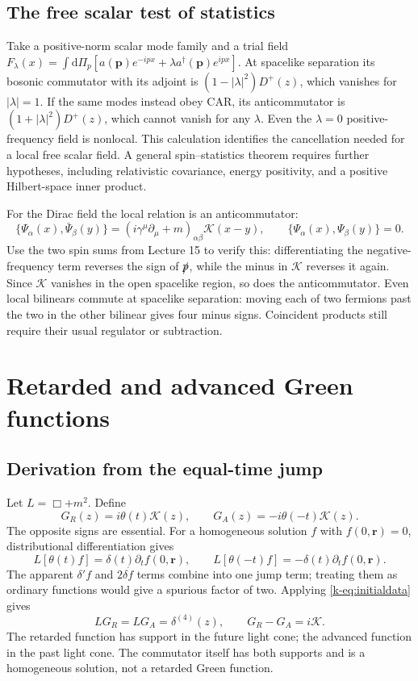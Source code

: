 \documentclass[11pt]{article}
\newcommand{\dd}{\mathrm{d}}
\begin{document}
\subsection{The free scalar test of statistics}
Take a positive-norm scalar mode family and a trial field
\(F_\lambda(x)=\int\dd\Pi_p[a(\bm p)e^{-ipx}
+\lambda a^\dagger(\bm p)e^{ipx}]\).
At spacelike separation its bosonic commutator with its adjoint is
\((1-|\lambda|^2)D^+(z)\), which vanishes for \(|\lambda|=1\).
If the same modes instead obey CAR, its anticommutator is
\((1+|\lambda|^2)D^+(z)\), which cannot vanish for any \(\lambda\).
Even the \(\lambda=0\) positive-frequency field is nonlocal.
This calculation identifies the cancellation needed for a local free
scalar field. A general spin--statistics theorem requires further
hypotheses, including relativistic covariance, energy positivity, and
a positive Hilbert-space inner product.

For the Dirac field the local relation is an anticommutator:
\begin{equation}
 \{\Psi_\alpha(x),\bar\Psi_\beta(y)\}
   =(i\gamma^\mu\partial_\mu+m)_{\alpha\beta}\mathcal K(x-y),
 \qquad \{\Psi_\alpha(x),\Psi_\beta(y)\}=0.
 \label{k-eq:Diraclocal}
\end{equation}
Use the two spin sums from Lecture 15 to verify this: differentiating the
negative-frequency term reverses the sign of \(\slashed p\), while the
minus in \(\mathcal K\) reverses it again. Since \(\mathcal K\) vanishes in
the open spacelike region, so does the anticommutator. Even local
bilinears commute at spacelike separation: moving each of two fermions
past the two in the other bilinear gives four minus signs. Coincident
products still require their usual regulator or subtraction.

\section{Retarded and advanced Green functions}
\subsection{Derivation from the equal-time jump}
Let \(L=\Box+m^2\). Define
\begin{equation}
 G_R(z)=i\theta(t)\mathcal K(z),\qquad
 G_A(z)=-i\theta(-t)\mathcal K(z).
 \label{k-eq:RA}
\end{equation}
The opposite signs are essential. For a homogeneous solution \(f\) with
\(f(0,\bm r)=0\), distributional differentiation gives
\[
 L[\theta(t)f]=\delta(t)\partial_t f(0,\bm r),\qquad
 L[\theta(-t)f]=-\delta(t)\partial_t f(0,\bm r).
\]
The apparent \(\delta' f\) and \(2\delta\dot f\) terms combine into one
jump term; treating them as ordinary functions would give a spurious
factor of two. Applying \eqref{k-eq:initialdata} gives
\begin{equation}
 LG_R=LG_A=\delta^{(4)}(z),\qquad G_R-G_A=i\mathcal K.
 \label{k-eq:RAequation}
\end{equation}
The retarded function has support in the future light cone; the advanced
function in the past light cone. The commutator itself has both supports
and is a homogeneous solution, not a retarded Green function.
\end{document}
